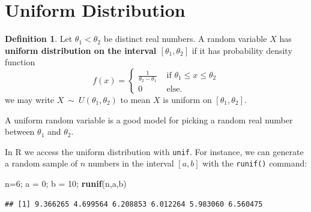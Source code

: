 \documentclass[
]{book}
\newenvironment{Shaded}{\begin{snugshade}}{\end{snugshade}}
\newcommand{\DecValTok}[1]{\textcolor[rgb]{0.00,0.00,0.81}{#1}}
\newcommand{\FunctionTok}[1]{\textcolor[rgb]{0.13,0.29,0.53}{\textbf{#1}}}
\newcommand{\NormalTok}[1]{#1}
\newcommand{\OtherTok}[1]{\textcolor[rgb]{0.56,0.35,0.01}{#1}}
\theoremstyle{definition}
\newtheorem{definition}{Definition}[chapter]
\theoremstyle{definition}
\theoremstyle{definition}
\theoremstyle{definition}
\theoremstyle{remark}
\begin{document}
\section{Uniform Distribution}\label{uniform-continuous}

\begin{definition}
\protect\hypertarget{def:uniform-distribution}{}\label{def:uniform-distribution}Let \(\theta_1 < \theta_2\) be distinct real numbers. A random variable \(X\) has \textbf{uniform distribution on the interval \([\theta_1,\theta_2]\)} if it has probability density function
\[
f(x)=
\begin{cases}
\frac{1}{\theta_2 - \theta_1} &\text{ if }\theta_1 \leq x \leq \theta_2 \\
0 &\text{ else.} 
\end{cases}
\]
we may write \(X ~\sim~ U(\theta_1,\theta_2)\) to mean \(X\) is uniform on \([\theta_1,\theta_2]\).
\end{definition}

A uniform random variable is a good model for picking a random real number between \(\theta_1\) and \(\theta_2\).

In R we access the uniform distribution with \texttt{unif}. For instance, we can generate a random sample of \(n\) numbers in the interval \([a,b]\) with the \texttt{runif()} command:

\begin{Shaded}
\begin{Highlighting}[]
\NormalTok{n}\OtherTok{=}\DecValTok{6}\NormalTok{; a }\OtherTok{=} \DecValTok{0}\NormalTok{; b }\OtherTok{=} \DecValTok{10}\NormalTok{;}
\FunctionTok{runif}\NormalTok{(n,a,b)}
\end{Highlighting}
\end{Shaded}

\begin{verbatim}
## [1] 9.366265 4.699564 6.208853 6.012264 5.983060 6.560475
\end{verbatim}
\end{document}
